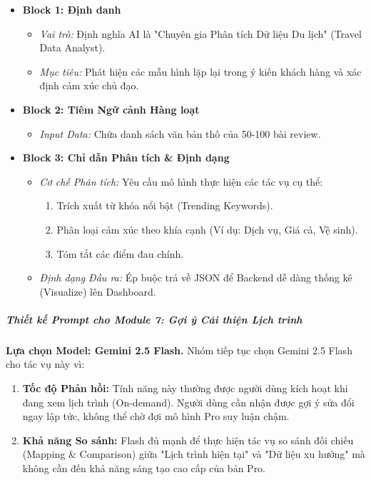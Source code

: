 \begin{itemize}
    \item \textbf{Block 1: Định danh}
    \begin{itemize}
        \item \textit{Vai trò:} Định nghĩa AI là "Chuyên gia Phân tích Dữ liệu Du lịch" (Travel Data Analyst).
        \item \textit{Mục tiêu:} Phát hiện các mẫu hình lặp lại trong ý kiến khách hàng và xác định cảm xúc chủ đạo.
    \end{itemize}
    
    \item \textbf{Block 2: Tiêm Ngữ cảnh Hàng loạt}
    \begin{itemize}
        \item \textit{Input Data:} Chứa danh sách văn bản thô của 50-100 bài review.
    \end{itemize}
    
    \item \textbf{Block 3: Chỉ dẫn Phân tích \& Định dạng}
    \begin{itemize}
        \item \textit{Cơ chế Phân tích:} Yêu cầu mô hình thực hiện các tác vụ cụ thể:
        \begin{enumerate}[label=\arabic*., leftmargin=*]
            \item Trích xuất từ khóa nổi bật (Trending Keywords).
            \item Phân loại cảm xúc theo khía cạnh (Ví dụ: Dịch vụ, Giá cả, Vệ sinh).
            \item Tóm tắt các điểm đau chính.
        \end{enumerate}
        \item \textit{Định dạng Đầu ra:} Ép buộc trả về JSON để Backend dễ dàng thống kê (Visualize) lên Dashboard.
    \end{itemize}
\end{itemize}

\subparagraph{Thiết kế Prompt cho Module 7: Gợi ý Cải thiện Lịch trình}

\textbf{Lựa chọn Model: Gemini 2.5 Flash.} Nhóm tiếp tục chọn Gemini 2.5 Flash cho tác vụ này vì:

\begin{enumerate}[label=\arabic*., leftmargin=*]
    \item \textbf{Tốc độ Phản hồi:} Tính năng này thường được người dùng kích hoạt khi đang xem lịch trình (On-demand). Người dùng cần nhận được gợi ý sửa đổi ngay lập tức, không thể chờ đợi mô hình Pro suy luận chậm.
    
    \item \textbf{Khả năng So sánh:} Flash đủ mạnh để thực hiện tác vụ so sánh đối chiếu (Mapping \& Comparison) giữa "Lịch trình hiện tại" và "Dữ liệu xu hướng" mà không cần đến khả năng sáng tạo cao cấp của bản Pro.
\end{enumerate}

